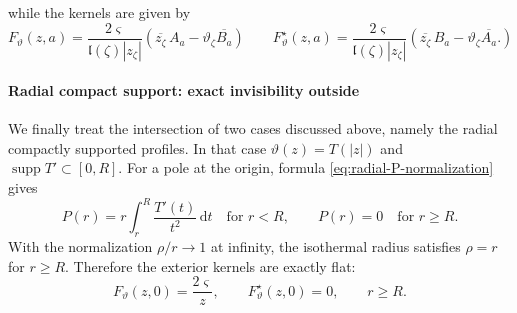 \documentclass[reqno]{amsart}
\numberwithin{equation}{section}
\theoremstyle{definition}
\theoremstyle{remark}
\providecommand{\dd}{\,\mathrm d}
\providecommand{\supp}{\operatorname{supp}}
\providecommand{\ellm}{\mathfrak l}
\begin{document}
while the kernels are given by
\begin{equation}
	F_\vartheta(z,a)=\frac{2\varsigma}{\ellm(\zeta) |z_\zeta|}
        \left(
        \overline{z_\zeta}\,A_a-
        \vartheta_\zeta\overline{B_a}
        \right) \qquad F^\star_\vartheta(z,a)
        =
        \frac{2\varsigma}{\ellm(\zeta) |z_\zeta|}
        \left(
        \overline{z_\zeta}\,B_a
        -
        \vartheta_\zeta\overline{A_a}.
        \right)
\end{equation}

\paragraph{\textbf{Radial compact support: exact invisibility outside}}
We finally treat the intersection of two cases discussed above, namely the radial compactly supported profiles. In that case $   \vartheta(z)=T(|z|) $ and $\supp T'\subset[0,R]$. For a pole at the origin, formula \eqref{eq:radial-P-normalization} gives
\begin{equation}\label{eq:radial-compact-P}
        P(r)=r\int_r^R\frac{T'(t)}{t^2}\dd t
        \quad\text{for }r<R,
        \qquad
        P(r)=0
        \quad\text{for }r\geq R.
\end{equation}
With the normalization $\rho/r\to1$ at infinity, the isothermal radius satisfies
$\rho=r$ for $r\geq R$. Therefore the exterior kernels are exactly flat:
\begin{equation}\label{eq:radial-compact-outside-flat}
        F_\vartheta(z,0)=\frac{2\varsigma}{z},
        \qquad
        F^\star_\vartheta(z,0)=0,
        \qquad r\geq R.
\end{equation}



\printbibliography
\end{document}
